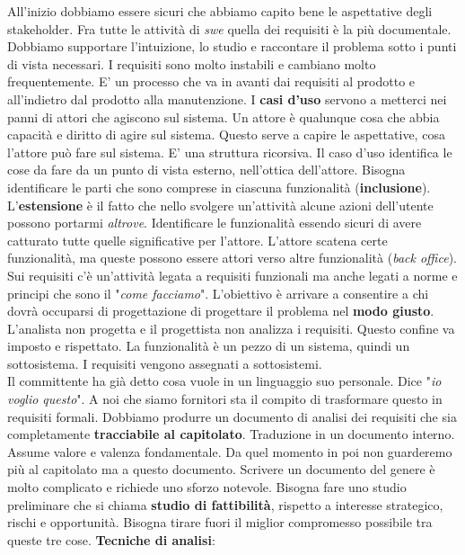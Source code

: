 All'inizio dobbiamo essere sicuri che abbiamo capito bene le aspettative degli stakeholder. Fra tutte le attività di \textit{swe} quella dei requisiti è la più documentale. Dobbiamo supportare l'intuizione, lo studio e raccontare il problema sotto i punti di vista necessari. I requisiti sono molto instabili e cambiano molto frequentemente. E' un processo che va in avanti dai requisiti al prodotto e all'indietro dal prodotto alla manutenzione. I \textbf{casi d'uso} servono a metterci nei panni di attori che agiscono sul sistema. Un attore è qualunque cosa che abbia capacità e diritto di agire sul sistema. Questo serve a capire le aspettative, cosa l'attore può fare sul sistema. E' una struttura ricorsiva. Il caso d'uso identifica le cose da fare da un punto di vista esterno, nell'ottica dell'attore. Bisogna identificare le parti che sono comprese in ciascuna funzionalità (\textbf{inclusione}). L'\textbf{estensione} è il fatto che nello svolgere un'attività alcune azioni dell'utente possono portarmi \textit{altrove}. Identificare le funzionalità essendo sicuri di avere catturato tutte quelle significative per l'attore. L'attore scatena certe funzionalità, ma queste possono essere attori verso altre funzionalità (\textit{back office}). Sui requisiti c'è un'attività legata a requisiti funzionali ma anche legati a norme e principi che sono il "\textit{come facciamo}". L'obiettivo è arrivare a consentire a chi dovrà occuparsi di progettazione di progettare il problema nel \textbf{modo giusto}. L'analista non progetta e il progettista non analizza i requisiti. Questo confine va imposto e rispettato. La funzionalità è un pezzo di un sistema, quindi un sottosistema. I requisiti vengono assegnati a sottosistemi.\\
Il committente ha già detto cosa vuole in un linguaggio suo personale. Dice "\textit{io voglio questo}". A noi che siamo fornitori sta il compito di trasformare questo in requisiti formali. Dobbiamo produrre un documento di analisi dei requisiti che sia completamente \textbf{tracciabile al capitolato}. Traduzione in un documento interno. Assume valore e valenza fondamentale. Da quel momento in poi non guarderemo più al capitolato ma a questo documento. Scrivere un documento del genere è molto complicato e richiede uno sforzo notevole. Bisogna fare uno studio preliminare che si chiama \textbf{studio di fattibilità}, rispetto a interesse strategico, rischi e opportunità. Bisogna tirare fuori il miglior compromesso possibile tra queste tre cose. \textbf{Tecniche di analisi}:

